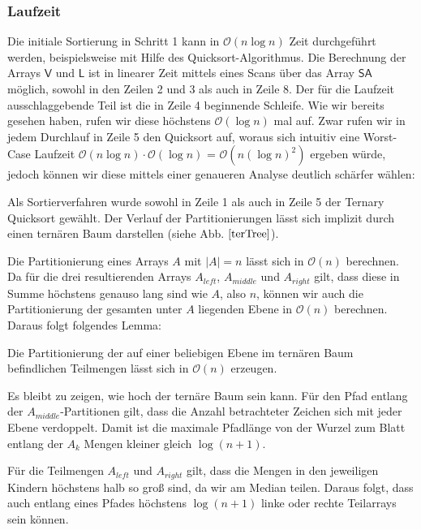 \subsubsection{Laufzeit}
Die initiale Sortierung in Schritt 1 kann in $\mathcal{O}(n\log n)$ Zeit durchgeführt werden, beispielsweise mit Hilfe des Quicksort-Algorithmus. Die Berechnung der Arrays $\mathsf{V}$ und $\mathsf{L}$ ist in linearer Zeit mittels eines Scans über das Array $\mathsf{SA}$ möglich, sowohl in den Zeilen 2 und 3 als auch in Zeile 8. Der für die Laufzeit ausschlaggebende Teil ist die in Zeile 4 beginnende Schleife. Wie wir bereits gesehen haben, rufen wir diese höchstens $\mathcal{O}(\log n)$ mal auf. Zwar rufen wir in jedem Durchlauf in Zeile 5 den Quicksort auf, woraus sich intuitiv eine Worst-Case Laufzeit $\mathcal{O}(n\log  n)\cdot \mathcal{O}(\log n)$ = $\mathcal{O}(n(\log n)^2)$ ergeben würde, jedoch können wir diese mittels einer genaueren Analyse deutlich schärfer wählen:

Als Sortierverfahren wurde sowohl in Zeile 1 als auch in Zeile 5 der Ternary Quicksort gewählt. Der Verlauf der Partitionierungen lässt sich implizit durch einen ternären Baum darstellen (siehe Abb. $\ref{terTree}$).

Die Partitionierung eines Arrays $A$ mit $|A|=n$ lässt sich in $\mathcal{O}(n)$ berechnen. Da für die drei resultierenden Arrays $A_{left}$, $A_{middle}$ und $A_{right}$ gilt, dass diese in Summe höchstens genauso lang sind wie $A$, also $n$, können wir auch die Partitionierung der gesamten unter $A$ liegenden Ebene in $\mathcal{O}(n)$ berechnen. Daraus folgt folgendes Lemma:
\begin{lemma}
Die Partitionierung der auf einer beliebigen Ebene im ternären Baum befindlichen Teilmengen lässt sich in $\mathcal{O}(n)$ erzeugen. 
\end{lemma}
Es bleibt zu zeigen, wie hoch der ternäre Baum sein kann. Für den Pfad entlang der $A_{middle}$-Partitionen gilt, dass die Anzahl betrachteter Zeichen sich mit jeder Ebene verdoppelt. Damit ist die maximale Pfadlänge von der Wurzel zum Blatt entlang der $A_k$ Mengen kleiner gleich $ \log (n+1)$.

Für die Teilmengen $A_{left}$ und $A_{right}$ gilt, dass die Mengen in den jeweiligen Kindern höchstens halb so groß sind, da wir am Median teilen. Daraus folgt, dass auch entlang eines Pfades höchstens $\log (n+1)$ linke oder rechte Teilarrays sein können.

